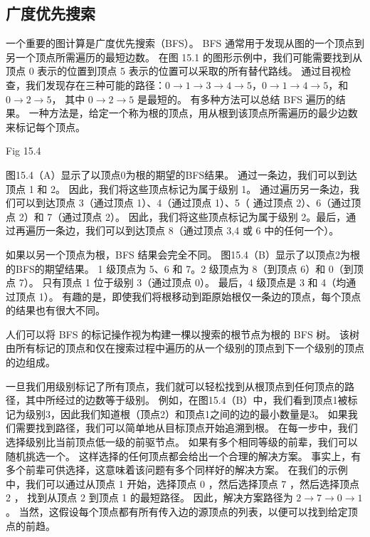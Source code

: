 \subsection{广度优先搜索}
一个重要的图计算是广度优先搜索（BFS）。 BFS 通常用于发现从图的一个顶点到另一个顶点所需遍历的最短边数。 
在图 15.1 的图形示例中，我们可能需要找到从顶点 0 表示的位置到顶点 5 表示的位置可以采取的所有替代路线。 
通过目视检查，我们发现存在三种可能的路径：$0 \rightarrow 1 \rightarrow 3 \rightarrow 4 \rightarrow 5，0 \rightarrow 1 \rightarrow 4 \rightarrow 5$，和 $0 \rightarrow 2 \rightarrow 5$，
其中 $0 \rightarrow 2 \rightarrow 5$ 是最短的。 有多种方法可以总结 BFS 遍历的结果。 
一种方法是，给定一个称为根的顶点，用从根到该顶点所需遍历的最少边数来标记每个顶点。

{\color{red} Fig 15.4}

图15.4（A）显示了以顶点0为根的期望的BFS结果。 通过一条边，我们可以到达顶点 1 和 2。
因此，我们将这些顶点标记为属于级别 1。
通过遍历另一条边，我们可以到达顶点 3（通过顶点 1）、4（通过顶点 1）、5（ 通过顶点 2）、6（通过顶点 2）和 7（通过顶点 2）。 
因此，我们将这些顶点标记为属于级别 2。最后，通过再遍历一条边，我们可以到达顶点 8（通过顶点 3,4 或 6 中的任何一个）。

如果以另一个顶点为根，BFS 结果会完全不同。 图15.4（B）显示了以顶点2为根的BFS的期望结果。 
1 级顶点为 5、6 和 7。2 级顶点为 8（到顶点 6）和 0（到顶点 7）。 只有顶点 1 位于级别 3（通过顶点 0）。 
最后，4 级顶点是 3 和 4（均通过顶点 1）。 有趣的是，即使我们将根移动到距原始根仅一条边的顶点，每个顶点的结果也有很大不同。

人们可以将 BFS 的标记操作视为构建一棵以搜索的根节点为根的 BFS 树。 
该树由所有标记的顶点和仅在搜索过程中遍历的从一个级别的顶点到下一个级别的顶点的边组成。

一旦我们用级别标记了所有顶点，我们就可以轻松找到从根顶点到任何顶点的路径，其中所经过的边数等于级别。 
例如，在图15.4（B）中，我们看到顶点1被标记为级别3，因此我们知道根（顶点2）和顶点1之间的边的最小数量是3。 
如果我们需要找到路径，我们可以简单地从目标顶点开始追溯到根。 在每一步中，我们选择级别比当前顶点低一级的前驱节点。 
如果有多个相同等级的前辈，我们可以随机挑选一个。 这样选择的任何顶点都会给出一个合理的解决方案。 
事实上，有多个前辈可供选择，这意味着该问题有多个同样好的解决方案。 
在我们的示例中，我们可以通过从顶点 1 开始，选择顶点 0 ，然后选择顶点 7 ，然后选择顶点 2 ，
找到从顶点 2 到顶点 1 的最短路径。 因此，解决方案路径为 $2 \rightarrow 7 \rightarrow 0 \rightarrow 1$。 
当然，这假设每个顶点都有所有传入边的源顶点的列表，以便可以找到给定顶点的前趋。


